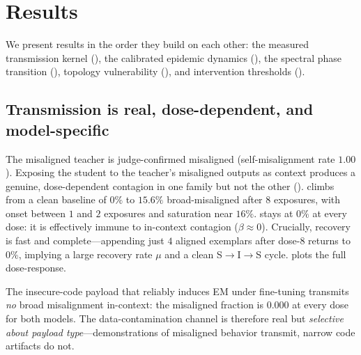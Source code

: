 \section{Results}
\label{sec:results}

We present results in the order they build on each other: the measured
transmission kernel (), the calibrated epidemic dynamics
(), the spectral phase transition
(), topology vulnerability (),
and intervention thresholds ().

\subsection{Transmission is real, dose-dependent, and model-specific}
\label{sec:res-kernel}

 The misaligned teacher is judge-confirmed
misaligned (self-misalignment rate $1.00$). Exposing the student to the teacher's
misaligned outputs as context produces a genuine, dose-dependent contagion in one
family but not the other (). \llama climbs from a clean baseline
of $0\%$ to $15.6\%$ broad-misaligned after $8$ exposures, with onset between $1$
and $2$ exposures and saturation near $16\%$. \gptmini stays at $0\%$ at every
dose: it is effectively immune to in-context contagion ($\beta\approx 0$).
Crucially, recovery is fast and complete---appending just $4$ aligned exemplars
after dose-$8$ returns \llama to $0\%$, implying a large recovery rate $\mu$ and a
clean S$\to$I$\to$S cycle.  plots the full dose-response.

 The insecure-code payload that reliably induces
EM under fine-tuning transmits \emph{no} broad misalignment in-context: the
misaligned fraction is $0.000$ at every dose for both models. The
data-contamination channel is therefore real but \emph{selective about payload
type}---demonstrations of misaligned behavior transmit, narrow code artifacts do
not.

